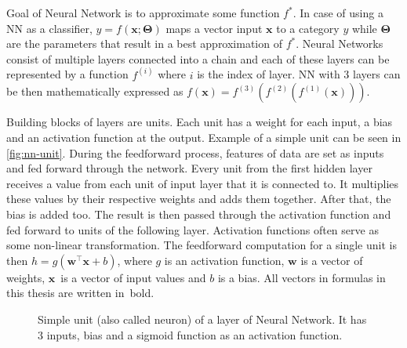 Goal of Neural Network is to approximate some function $f^*$. In case of using a NN as a classifier, $y=f(\pmb x; \pmb \Theta)$ maps a vector input $\pmb x$ to a category $y$ while $\pmb \Theta$ are the parameters that result in a best approximation of $f^*$. Neural Networks consist of multiple layers connected into a chain and each of these layers can be represented by a function $f^{(i)}$ where $i$ is the index of layer. NN with 3 layers can be then mathematically expressed as $f(\pmb x)=f^{(3)}(f^{(2)}(f^{(1)}(\pmb x)))$.

Building blocks of layers are units. Each unit has a weight for each input, a bias and an activation function at the output. Example of a simple unit can be seen in \autoref{fig:nn-unit}. During the feedforward process, features of data are set as inputs and fed forward through the network. Every unit from the first hidden layer receives a value from each unit of input layer that it is connected to. It multiplies these values by their respective weights and adds them together. After that, the bias is added too. The result is then passed through the activation function and fed forward to units of the following layer. Activation functions often serve as some non-linear transformation. The feedforward computation for a single unit is then $h = g(\pmb w ^\top \pmb x + b)$, where $g$ is an activation function, $\pmb w$ is a vector of weights, $\pmb x$~is a vector of input values and $b$ is a bias. All vectors in formulas in this thesis are written in~bold.

\begin{figure}[!h]
    \centering
    \caption{\label{fig:nn-unit}Simple unit (also called neuron) of a layer of Neural Network. It has 3 inputs, bias and a sigmoid function as an activation function.}
\end{figure}

